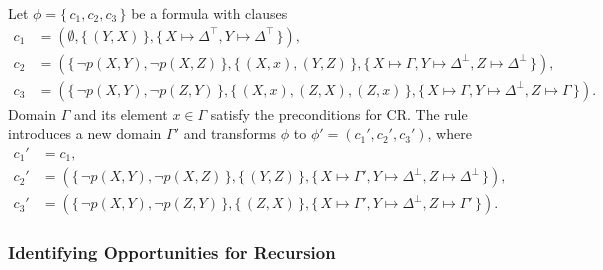 \begin{example}
  Let $\phi = \{\, c_1, c_2, c_3 \,\}$ be a formula with clauses
  \begin{align*}
    c_1 &= (\emptyset, \{\, (Y, X) \,\}, \{\, X \mapsto \Delta^\top, Y \mapsto \Delta^\top \,\}), \\
    c_2 &= (\{\, \neg p(X, Y), \neg p(X, Z) \,\}, \{\, (X, x), (Y, Z) \,\}, \{\, X \mapsto \Gamma, Y \mapsto \Delta^\bot, Z \mapsto \Delta^\bot \,\}), \\
    c_3 &= (\{\, \neg p(X, Y), \neg p(Z, Y) \,\}, \{\, (X, x), (Z, X), (Z, x) \,\}, \{\, X \mapsto \Gamma, Y \mapsto \Delta^\bot, Z \mapsto \Gamma \,\}).
  \end{align*}
  Domain $\Gamma$ and its element $x \in \Gamma$ satisfy the preconditions for
  CR\@. The rule introduces a new domain $\Gamma'$ and transforms $\phi$ to
  $\phi' = (c_1', c_2', c_3')$, where
  \begin{align*}
    c_1' &= c_1, \\
    c_2' &= (\{\, \neg p(X, Y), \neg p(X, Z) \,\}, \{\, (Y, Z) \,\}, \{\, X \mapsto \Gamma', Y \mapsto \Delta^\bot, Z \mapsto \Delta^\bot \,\}), \\
    c_3' &= (\{\, \neg p(X, Y), \neg p(Z, Y) \,\}, \{\, (Z, X) \,\}, \{\, X \mapsto \Gamma', Y \mapsto \Delta^\bot, Z \mapsto \Gamma' \,\}).
  \end{align*}
\end{example}

\subsubsection{Identifying Opportunities for Recursion}\label{sec:ref}

